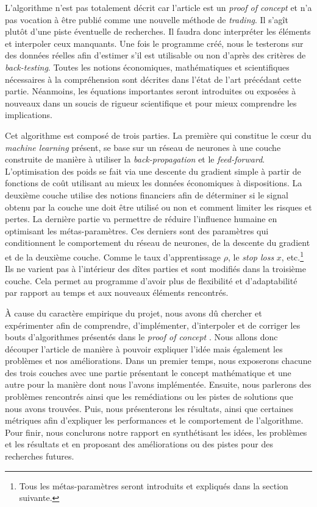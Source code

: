 \documentclass[a4paper, 11pt]{article}
\begin{document}
L'algorithme n'est pas totalement décrit car l'article
est un \textit{proof of concept} et n'a pas vocation à être publié comme une nouvelle méthode de \textit{trading}. Il s'agît plutôt d'une piste 
éventuelle de recherches. Il faudra donc
interpréter les éléments et interpoler ceux manquants. Une fois le programme créé, nous le testerons sur des données réelles afin d'estimer s'il est
utilisable ou non d'après des critères de \textit{back-testing}. Toutes les notions économiques, mathématiques et scientifiques nécessaires à la 
compréhension sont décrites dans l'état de l'art précédant cette partie. Néanmoins, les équations importantes seront introduites ou exposées à nouveaux
dans un soucis de rigueur scientifique et pour mieux comprendre les implications.

Cet algorithme est composé de trois parties. La première qui constitue le cœur du \textit{machine learning} présent, se base sur un réseau de neurones
à une couche construite de manière à utiliser la \textit{back-propagation} et le \textit{feed-forward}. L'optimisation des poids se fait via une descente du gradient simple 
à partir de fonctions de coût utilisant au mieux les données économiques à dispositions. La deuxième couche utilise des notions financiers afin de
déterminer si le signal obtenu par la couche une doit être utilisé ou non et comment limiter les risques et pertes. La dernière partie va permettre de
réduire l'influence humaine en optimisant les métas-paramètres. Ces derniers sont des paramètres qui conditionnent le comportement du réseau de neurones,
de la descente du gradient et de la deuxième couche. Comme le taux d'apprentissage $\rho$, le \textit{stop loss} $x$, etc.\footnote{Tous les métas-paramètres
seront introduits et expliqués dans la section suivante.} Ils ne varient pas 
à l'intérieur des dîtes parties et sont modifiés dans la troisième couche. Cela permet au programme d'avoir plus de flexibilité et d'adaptabilité par
rapport au temps et aux nouveaux éléments rencontrés.

À cause du caractère empirique du projet, nous avons dû chercher et expérimenter afin de comprendre, d'implémenter, d'interpoler et de corriger
les bouts d'algorithmes présentés dans le \textit{proof of concept} \cite{fx_trading}. Nous allons donc découper l'article de manière à pouvoir 
expliquer l'idée mais également les problèmes et nos améliorations.
Dans un premier temps, nous exposerons chacune des trois couches avec une partie présentant le concept mathématique et une autre pour la manière dont nous
l'avons implémentée. Ensuite, nous parlerons des problèmes rencontrés ainsi que les remédiations ou les pistes de solutions que nous avons trouvées.
Puis, nous présenterons les résultats, ainsi que certaines métriques afin d'expliquer les performances et le comportement de l'algorithme. Pour
finir, nous conclurons notre rapport en synthétisant les idées, les problèmes et les résultats et en proposant des améliorations ou des pistes pour 
des recherches futures.
\end{document}
